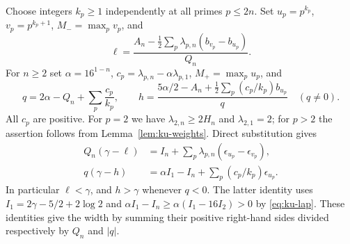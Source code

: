\documentclass[11pt,a4paper]{article}
\theoremstyle{definition}\newtheorem{definition}[theorem]{Definition}\newtheorem{example}[theorem]{Example}
\theoremstyle{remark}\newtheorem{remark}[theorem]{Remark}
\begin{document}
Choose integers $k_p\ge1$ independently at all primes $p\le2n$.
Set $u_p=p^{k_p}$, $v_p=p^{k_p+1}$, $M_-=\max_pv_p$, and
\begin{equation}
 \ell=\frac{A_n-\tfrac12\sum_p\lambda_{p,n}(b_{v_p}-b_{u_p})}{Q_n}.
 \label{eq:ku-lower}
\end{equation}
For $n\ge2$ set $\alpha=16^{1-n}$, $c_p=\lambda_{p,n}-\alpha\lambda_{p,1}$,
$M_+=\max_pu_p$, and
\begin{equation}
 q=2\alpha-Q_n+\sum_p\frac{c_p}{k_p},\qquad
 h=\frac{5\alpha/2-A_n+\tfrac12\sum_p(c_p/k_p)b_{u_p}}{q}
 \quad (q\ne0).
 \label{eq:ku-upper}
\end{equation}
All $c_p$ are positive. For $p=2$ we have $\lambda_{2,n}\ge2H_n$
and $\lambda_{2,1}=2$; for $p>2$ the assertion follows from
Lemma~\ref{lem:ku-weights}. Direct substitution gives
\begin{align}
 Q_n(\gamma-\ell)&=I_n+\sum_p\lambda_{p,n}
          (\epsilon_{u_p}-\epsilon_{v_p}),\label{eq:ku-lerr}\\
 q(\gamma-h)&=\alpha I_1-I_n+\sum_p(c_p/k_p)\epsilon_{u_p}.
 \label{eq:ku-uerr}
\end{align}
In particular $\ell<\gamma$, and $h>\gamma$ whenever $q<0$.
The latter identity uses $I_1=2\gamma-5/2+2\log2$ and
$\alpha I_1-I_n\ge\alpha(I_1-16I_2)>0$ by \eqref{eq:ku-lap}.
These identities give the width by summing their positive right-hand
sides divided respectively by $Q_n$ and $|q|$.
\end{document}
